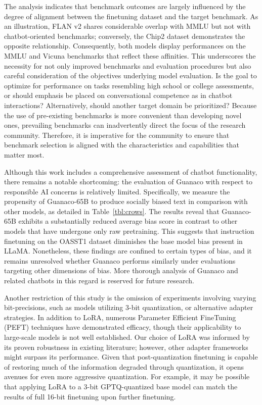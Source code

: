 The analysis indicates that benchmark outcomes are largely influenced by the degree of alignment between the finetuning dataset and the target benchmark. As an illustration, FLAN v2 shares considerable overlap with MMLU but not with chatbot-oriented benchmarks; conversely, the Chip2 dataset demonstrates the opposite relationship. Consequently, both models display performances on the MMLU and Vicuna benchmarks that reflect these affinities. This underscores the necessity for not only improved benchmarks and evaluation procedures but also careful consideration of the objectives underlying model evaluation. Is the goal to optimize for performance on tasks resembling high school or college assessments, or should emphasis be placed on conversational competence as in chatbot interactions? Alternatively, should another target domain be prioritized? Because the use of pre-existing benchmarks is more convenient than developing novel ones, prevailing benchmarks can inadvertently direct the focus of the research community. Therefore, it is imperative for the community to ensure that benchmark selection is aligned with the characteristics and capabilities that matter most.

Although this work includes a comprehensive assessment of chatbot functionality, there remains a notable shortcoming: the evaluation of {Guanaco} with respect to responsible AI concerns is relatively limited. Specifically, we measure the propensity of {Guanaco}-65B to produce socially biased text in comparison with other models, as detailed in Table~\ref{tbl:crows}. The results reveal that {Guanaco}-65B exhibits a substantially reduced average bias score in contrast to other models that have undergone only raw pretraining. This suggests that instruction finetuning on the OASST1 dataset diminishes the base model bias present in LLaMA. Nonetheless, these findings are confined to certain types of bias, and it remains unresolved whether {Guanaco} performs similarly under evaluations targeting other dimensions of bias. More thorough analysis of {Guanaco} and related chatbots in this regard is reserved for future research.

Another restriction of this study is the omission of experiments involving varying bit-precisions, such as models utilizing 3-bit quantization, or alternative adapter strategies. In addition to LoRA, numerous Parameter Efficient FineTuning (PEFT) techniques have demonstrated efficacy, though their applicability to large-scale models is not well established. Our choice of LoRA was informed by its proven robustness in existing literature; however, other adapter frameworks might surpass its performance. Given that post-quantization finetuning is capable of restoring much of the information degraded through quantization, it opens avenues for even more aggressive quantization. For example, it may be possible that applying LoRA to a 3-bit GPTQ-quantized base model can match the results of full 16-bit finetuning upon further finetuning.

